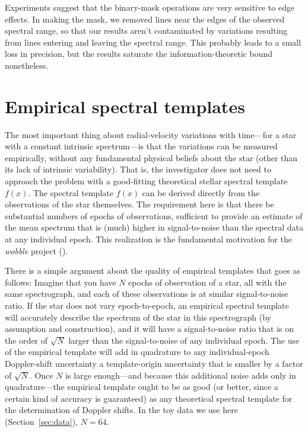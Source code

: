 \documentclass[modern]{aastex631}
\newcommand{\project}[1]{\textsl{#1}}
\newcommand{\wobble}{\project{wobble}}
\newcommand{\sectionname}{Section}
\newcommand{\secref}[1]{\sectionname~\ref{#1}}
\begin{document}
Experiments suggest that the binary-mask operations are very sensitive to edge effects.
In making the mask, we removed lines near the edges of the observed spectral range, so that our results aren't contaminated by variations resulting from lines entering and leaving the spectral range.
This probably leads to a small loss in precision, but the results saturate the information-theoretic bound nonetheless.

\section{Empirical spectral templates}\label{sec:templates}

The most important thing about radial-velocity variations with time---for a star with a constant intrinsic spectrum---is that the variations can be measured empirically, without any fundamental physical beliefs about the star (other than its lack of intrinsic variability).
That is, the investigator does not need to approach the problem with a good-fitting theoretical stellar spectral template $f(x)$.
The spectral template $f(x)$ can be derived directly from the observations of the star themselves.
The requirement here is that there be substantial numbers of epochs of observations, sufficient to provide an estimate of the mean spectrum that is (much) higher in signal-to-noise than the spectral data at any individual epoch.
This realization is the fundamental motivation for the \wobble{} project (\citealt{wobble}).

There is a simple argument about the quality of empirical templates that goes as follows:
Imagine that you have $N$ epochs of observation of a star, all with the same spectrograph, and each of these observations is at similar signal-to-noise ratio.
If the star does not vary epoch-to-epoch, an empirical spectral template will accurately describe the spectrum of the star in this spectrograph (by assumption and construction), and it will have a signal-to-noise ratio that is on the order of $\sqrt{N}$ larger than the signal-to-noise of any individual epoch.
The use of the empirical template will add in quadrature to any individual-epoch Doppler-shift uncertainty a template-origin uncertainty that is smaller by a factor of $\sqrt{N}$.
Once $N$ is large enough---and because this additional noise adds only in quadrature---the empirical template ought to be as good (or better, since a certain kind of accuracy is guaranteed) as any theoretical spectral template for the determination of Doppler shifts.
In the toy data we use here (\secref{sec:data}), $N=64$.
\end{document}

